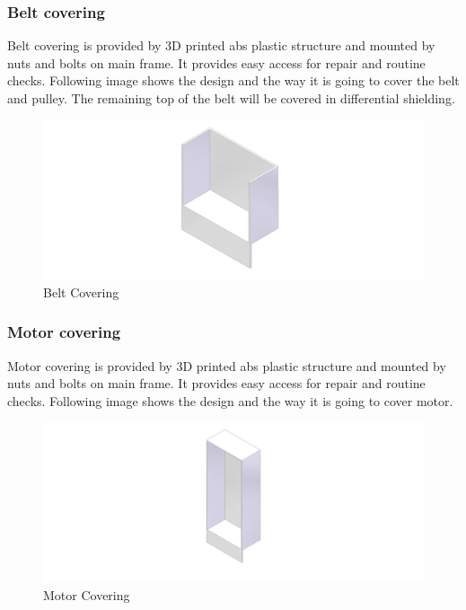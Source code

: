 \subsubsection*{Belt covering}
Belt covering is provided by 3D printed abs plastic structure and mounted by nuts and bolts on main frame. It provides easy access for repair and routine checks. Following image shows the design and the way it is going to cover the belt and pulley. The remaining top of the belt will be covered in differential shielding.     
\begin{figure}[H]
	\centering
	\includegraphics[width=0.7\linewidth]{../art/belt cover.jpg}
	\caption{Belt Covering}
\end{figure}

\subsubsection*{Motor covering}
Motor covering is provided by 3D printed abs plastic structure and mounted by nuts and bolts on main frame. It provides easy access for repair and routine checks. Following image shows the design and the way it is going to cover motor.     
\begin{figure}[H]
	\centering
	\includegraphics[width=0.8\linewidth]{../art/motor cover.jpg}
	\caption{Motor Covering}
\end{figure}

